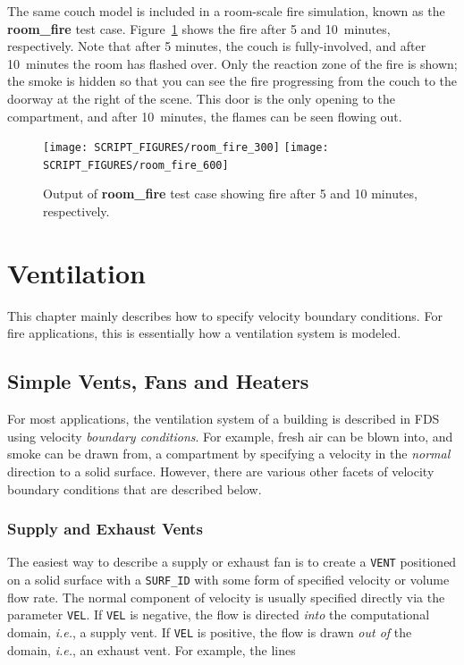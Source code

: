 \documentclass[11pt]{book}
\newcommand{\ct}{\tt\small}
\begin{document}
The same couch model is included in a room-scale fire simulation, known as the
{\bf room\_fire} test case. Figure~\ref{room_fire} shows the fire after 5 and 10~minutes, respectively.
Note that after 5 minutes, the couch is fully-involved, and after 10~minutes the room has flashed over.
Only the reaction zone of the fire is shown; the smoke is hidden so that you can see the fire progressing
from the couch to the doorway at the right of the scene. This door is the only opening to the compartment,
and after 10~minutes, the flames can be seen flowing out.

\begin{figure}[p]
\texttt{[image: SCRIPT\_FIGURES/room\_fire\_300]}
\texttt{[image: SCRIPT\_FIGURES/room\_fire\_600]}
\caption[Output of {\bf room\_fire} test case.]{Output of {\bf room\_fire} test case showing fire after
5 and 10 minutes, respectively.}
\label{room_fire}
\end{figure}

\newpage




\chapter{Ventilation}

This chapter mainly describes how to specify velocity boundary conditions. For fire applications, this is essentially how
a ventilation system is modeled.


\section{Simple Vents, Fans and Heaters}
\label{info:Velocity_BC}

For most applications, the ventilation system of a building is described in FDS using
velocity {\em boundary conditions}. For example, fresh air can be blown into, and smoke can
be drawn from, a compartment by specifying a velocity in the {\em normal} direction to a solid
surface. However, there are various other facets of velocity boundary conditions that are described below.

\subsection{Supply and Exhaust Vents}

The easiest way to describe a supply or exhaust fan is to create a {\ct VENT} positioned on a solid surface with
a {\ct SURF\_ID} with some form of specified velocity or volume flow rate.
The normal component of velocity is usually specified directly via the parameter
{\ct VEL}. If {\ct VEL} is negative, the flow is directed {\em into} the
computational domain, {\em i.e.}, a supply vent. If {\ct VEL} is positive, the flow is drawn {\em out of} the
domain, {\em i.e.}, an exhaust vent. For example, the lines
\end{document}
